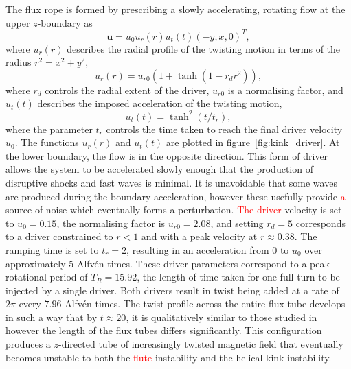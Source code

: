 \documentclass[12pt]{article}
\newcommand{\rs}[2]{\textcolor{red}{#2}}
\renewcommand{\vec}[1]{{\bm #1}}
\begin{document}
The flux rope is formed by prescribing a slowly accelerating, rotating flow at the upper $z$-boundary as
\begin{equation}
  \label{eq:null_twisting_profile}
  \vec{u} = u_0 u_r(r) u_t(t) (-y, x, 0)^T,
\end{equation}
where $u_r(r)$ describes the radial profile of the twisting motion in terms of the radius $r^2 = x^2 + y^2$,
\begin{equation}
  \label{eq:radial_twisting_function}
  u_r(r) = u_{r0}(1 + \tanh(1 - r_d r^2)),
\end{equation}
where $r_d$ controls the radial extent of the driver, $u_{r0}$ is a normalising factor, and $u_t(t)$ describes the imposed acceleration of the twisting motion,
\begin{equation}
  \label{eq:ramping_up_function}
  u_t(t) = \tanh^2(t/t_r),
\end{equation}
where the parameter $t_r$ controls the time taken to reach the final driver velocity $u_0$. The functions $u_r(r)$ and $u_t(t)$ are plotted in figure~\ref{fig:kink_driver}. At the lower boundary, the flow is in the opposite direction. This form of driver allows the system to be accelerated slowly enough that the production of disruptive shocks and fast waves is minimal. It is unavoidable that some waves are produced during the boundary acceleration, however these usefully provide \rs{one}{a} source of noise which eventually forms a perturbation.
\rs{}{
The driver} velocity is set to $u_0 = 0.15$, the normalising factor is $u_{r0} = 2.08$, and setting $r_d = 5$ corresponds to a driver constrained to $r<1$ and with a peak velocity at $r\approx 0.38$. The ramping time is set to $t_r = 2$, resulting in an acceleration from $0$ to $u_0$ over approximately $5$ Alfv\'en times. These driver parameters correspond to a peak rotational period of $T_R = 15.92$, the length of time taken for one full turn to be injected by a single driver. Both drivers result in twist being added at a rate of $2\pi$ every $7.96$ Alfv\'en times. The twist profile across the entire flux tube develops in such a way that by $t\approx 20$, it is qualitatively similar to those studied in~\cite{quinnEffectAnisotropicViscosity2020,hoodCoronalHeatingMagnetic2009,barefordShockHeatingNumerical2015} however the length of the flux tubes differs significantly. This configuration produces a $z$-directed tube of increasingly twisted magnetic field that eventually becomes unstable to both the \rs{fluting}{flute} instability and the helical kink instability.
\end{document}
